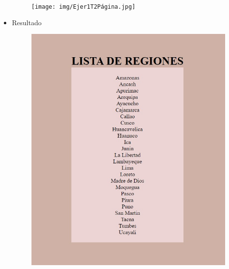 \documentclass{article}
\begin{document}
\begin{itemize}
\begin{figure}[H]
			\centering
			\texttt{[image: img/Ejer1T2Página.jpg]}
		\end{figure}
		\item Resultado
		\begin{figure}[H]
			\centering
			\includegraphics[width=1.0\textwidth,keepaspectratio]{img/Ejer1T2result.jpg}
		\end{figure}
	\end{itemize}
\end{document}
